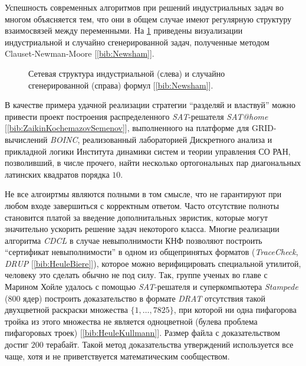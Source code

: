Успешность современных алгоритмов при решений индустриальных задач во многом объясняется тем, что они в общем случае имеют регулярную структуру взаимосвязей между переменными. На \figurename{ \ref{chapter1:fig:satgraph}} приведены визуализации индустриальной и случайно сгенерированной задач, полученные методом Clauset-Newman-Moore [\ref{bib:Newsham}].

\begin{figure}[h]
\centering
\captionsetup{justification=centering}
\caption{Сетевая структура индустриальной (слева) и случайно сгенерированной (справа) формул [\ref{bib:Newsham}].}
\label{chapter1:fig:satgraph}
\end{figure}

В качестве примера удачной реализации стратегии \enquote{разделяй и властвуй} можно привести проект построения распределенного \textit{SAT}-решателя \textit{SAT@home} [\ref{bib:ZaikinKochemazovSemenov}], выполненного на платформе для GRID-вычислений \textit{BOINC}, реализованный лабораторией Дискретного анализа и прикладной логики Института динамики систем и теории управления СО РАН, позволивший, в числе прочего, найти несколько ортогональных пар диагональных латинских квадратов порядка $10$.

Не все алгоиртмы являются полными в том смысле, что не гарантируют при любом входе завершиться с корректным ответом. Часто отсутствие полноты становится платой за введение дополнитальных эвристик, которые могут значительно ускорить решение задач некоторого класса. 
Многие реализации алгоритма \textit{CDCL} в случае невыполнимости КНФ позволяют построить \enquote{сертификат невыполнимости} в одном из общепринятых форматов (\textit{TraceCheck}, \textit{DRUP} [\ref{bib:HeuleBiere}]), которое можно верифицировать специальной утилитой, человеку это сделать обычно не под силу. 
Так, группе ученых во главе с Марином Хойле удалось с помощью \textit{SAT}-решателя и суперкомпьютера \textit{Stampede} ($800$ ядер) построить доказательство в формате \textit{DRAT} отсутствия такой двухцветной раскраски множества $\{1, \dots, 7825\}$, при которой ни одна пифагорова тройка из этого множества не является одноцветной (булева проблема пифагоровых троек) [\ref{bib:HeuleKullmann}]. 
Размер файла с доказательством достиг $200$ терабайт. Такой метод доказательства утверждений используется все чаще, хотя и не приветствуется математическим сообществом.

